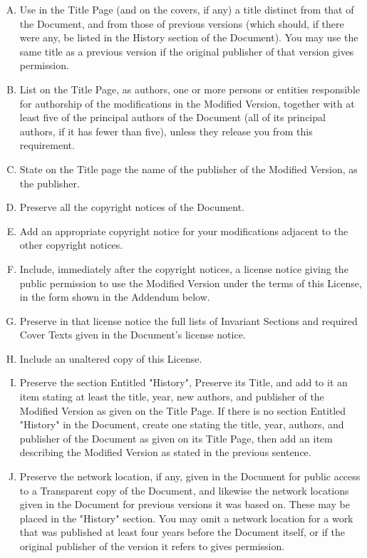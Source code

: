 \begin{enumerate}[A.]
\item Use in the Title Page (and on the covers, if any) a title distinct from that of the Document, and from those of previous versions (which should, 
   if there were any, be listed in the History section of the Document). You may use the same title as a previous version if the original publisher of that version gives permission. 
\item List on the Title Page, as authors, one or more persons or entities responsible for authorship of the modifications in the Modified Version, together with at least five 
of the principal authors of the Document (all of its principal authors, if it has fewer than five), unless they release you from this requirement. 
\item State on the Title page the name of the publisher of the Modified Version, as the publisher. 
\item Preserve all the copyright notices of the Document. 
\item Add an appropriate copyright notice for your modifications adjacent to the other copyright notices. 
\item Include, immediately after the copyright notices, a license notice giving the public permission to use the Modified Version under the terms of this 
License, in the form shown in the Addendum below. 
\item Preserve in that license notice the full lists of Invariant Sections and required Cover Texts given in the Document's license notice. 
\item Include an unaltered copy of this License. 
\item Preserve the section Entitled "History", Preserve its Title, and add to it an item stating at least the title, year, new authors, and publisher of 
the Modified Version as given on the Title Page. If there is no section Entitled "History" in the Document, create one stating the title, year, authors, 
and publisher of the Document as given on its Title Page, then add an item describing the Modified Version as stated in the previous sentence. 
\item Preserve the network location, if any, given in the Document for public access to a Transparent copy of the Document, and likewise the network 
locations given in the Document for previous versions it was based on. These may be placed in the "History" section. You may omit a network location for 
a work that was published at least four years before the Document itself, or if the original publisher of the version it refers to gives permission. 

\end{enumerate}
